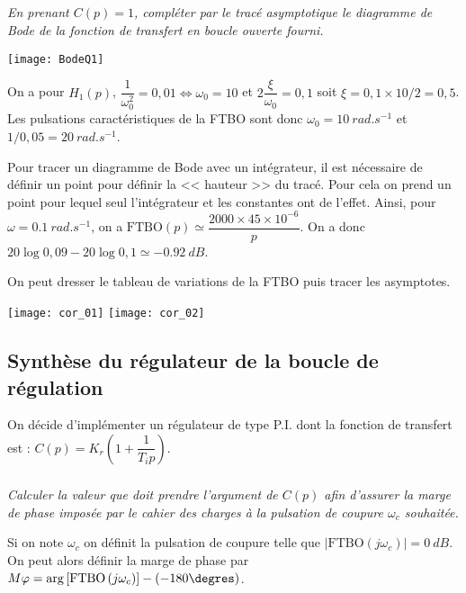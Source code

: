 \begin{multicols}{2}
\subparagraph{}\textit{En prenant $C(p)=1$, compléter par le tracé asymptotique le diagramme
de Bode de la fonction de transfert en boucle ouverte fourni.}%

\ifprof
\else
\begin{center}
\texttt{[image: BodeQ1]}
\end{center}
\fi

\ifprof
\begin{corrige}
On a pour $H_1(p)$, $\dfrac{1}{\omega_0^2}=0,01 \Leftrightarrow \omega_0=10$ et $2\dfrac{\xi}{\omega_0}=0,1$ soit $\xi = 0,1\times 10 / 2 = 0,5$. Les pulsations caractéristiques de la FTBO sont donc $\omega_0=\SI{10}{rad.s^{-1}}$ et $1/0,05 = \SI{20}{rad.s^{-1}}$.

Pour tracer un diagramme de Bode avec un intégrateur, il est nécessaire de définir un point pour définir la << hauteur >> du tracé. Pour cela on prend un point pour lequel seul l'intégrateur et les constantes ont de l'effet. Ainsi, pour $\omega=\SI{0,1}{rad.s^{-1}}$, on a $\text{FTBO}(p) \simeq \dfrac{2000\times 45\times 10^{-6}}{p}$. On a donc $20\log 0,09 - 20 \log 0,1 \simeq \SI{-0,92}{dB}$.

On peut dresser le tableau de variations de la FTBO puis tracer les asymptotes. 
\begin{center}
\texttt{[image: cor\_01]}
\texttt{[image: cor\_02]}
\end{center}
\end{corrige}
\else
\fi

\subsection*{Synthèse du régulateur de la boucle de régulation}

On décide d’implémenter un régulateur de type P.I. dont la fonction de transfert
est : $C(p)=K_r\left(1+\dfrac{1}{T_i p} \right)$.

\subparagraph{}\textit{Calculer la valeur que doit prendre l’argument de $C(p)$ afin d’assurer
la marge de phase imposée par le cahier des charges à la pulsation de coupure $\omega_c$
souhaitée.}

\footnotesize
\begin{methode}
Si on note $\omega_c$ on définit la pulsation de coupure telle que $|\text{FTBO}\left(j \omega_c \right)| = \SI{0}{dB}$. On peut alors définir la marge de phase par $M\varphi=\arg \left[\text{FTBO}\left( j \omega_c\right)\right]-\left(-180\degres\right)$.
\end{methode}


\end{multicols}
